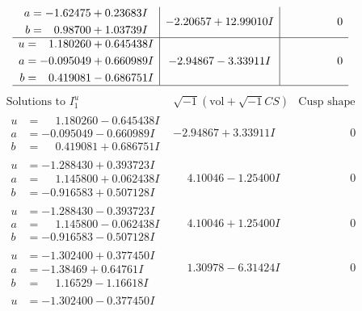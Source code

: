 \documentclass[1p]{elsarticle_modified}
\theoremstyle{definition}
\newcommand{\I}{\sqrt{-1}}
\begin{document}
$$\begin{array}{c|c|c}
\begin{aligned}
a &= -1.62475 + 0.23683 I \\
b &= \phantom{-}0.98700 + 1.03739 I\end{aligned}
 & -2.20657 + 12.99010 I & \phantom{-0.000000 } 0 \\ \hline\begin{aligned}
u &= \phantom{-}1.180260 + 0.645438 I \\
a &= -0.095049 + 0.660989 I \\
b &= \phantom{-}0.419081 - 0.686751 I\end{aligned}
 & -2.94867 - 3.33911 I & \phantom{-0.000000 } 0\\
 \hline 
 \end{array}$$\newpage$$\begin{array}{c|c|c}  
\text{Solutions to }I^u_{1}& \I (\text{vol} + \sqrt{-1}CS) & \text{Cusp shape}\\
 \hline 
\begin{aligned}
u &= \phantom{-}1.180260 - 0.645438 I \\
a &= -0.095049 - 0.660989 I \\
b &= \phantom{-}0.419081 + 0.686751 I\end{aligned}
 & -2.94867 + 3.33911 I & \phantom{-0.000000 } 0 \\ \hline\begin{aligned}
u &= -1.288430 + 0.393723 I \\
a &= \phantom{-}1.145800 + 0.062438 I \\
b &= -0.916583 + 0.507128 I\end{aligned}
 & \phantom{-}4.10046 - 1.25400 I & \phantom{-0.000000 } 0 \\ \hline\begin{aligned}
u &= -1.288430 - 0.393723 I \\
a &= \phantom{-}1.145800 - 0.062438 I \\
b &= -0.916583 - 0.507128 I\end{aligned}
 & \phantom{-}4.10046 + 1.25400 I & \phantom{-0.000000 } 0 \\ \hline\begin{aligned}
u &= -1.302400 + 0.377450 I \\
a &= -1.38469 + 0.64761 I \\
b &= \phantom{-}1.16529 - 1.16618 I\end{aligned}
 & \phantom{-}1.30978 - 6.31424 I & \phantom{-0.000000 } 0 \\ \hline\begin{aligned}
u &= -1.302400 - 0.377450 I \\

\end{aligned}
\end{array}$$
\end{document}
